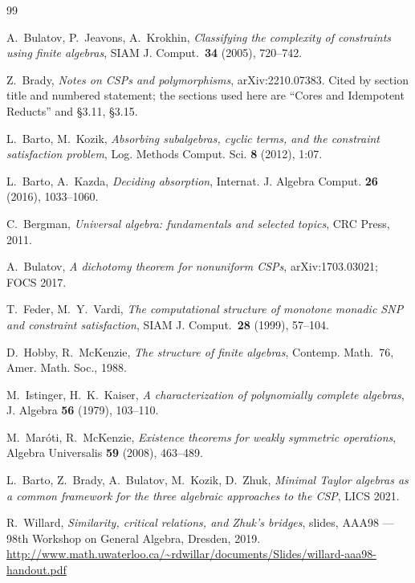 \begin{thebibliography}{99}

 A.~Bulatov, P.~Jeavons, A.~Krokhin,
  \emph{Classifying the complexity of constraints using finite algebras},
  SIAM J. Comput.\ \textbf{34} (2005), 720--742.

 Z.~Brady, \emph{Notes on CSPs and polymorphisms},
  arXiv:2210.07383. Cited by section title and numbered statement; the
  sections used here are ``Cores and Idempotent Reducts'' and \S3.11,
  \S3.15.

 L.~Barto, M.~Kozik, \emph{Absorbing subalgebras, cyclic
  terms, and the constraint satisfaction problem}, Log. Methods Comput. Sci.
  \textbf{8} (2012), 1:07.

 L.~Barto, A.~Kazda, \emph{Deciding absorption},
  Internat. J. Algebra Comput. \textbf{26} (2016), 1033--1060.

 C.~Bergman, \emph{Universal algebra: fundamentals and
  selected topics}, CRC Press, 2011.

 A.~Bulatov, \emph{A dichotomy theorem for nonuniform CSPs},
  arXiv:1703.03021; FOCS 2017.

 T.~Feder, M.~Y.~Vardi, \emph{The computational structure of
  monotone monadic SNP and constraint satisfaction}, SIAM J. Comput.\
  \textbf{28} (1999), 57--104.

 D.~Hobby, R.~McKenzie, \emph{The structure of finite
  algebras}, Contemp. Math.~76, Amer. Math. Soc., 1988.

 M.~Istinger, H.~K.~Kaiser, \emph{A characterization of
  polynomially complete algebras}, J. Algebra \textbf{56} (1979), 103--110.

 M.~Mar\'oti, R.~McKenzie, \emph{Existence theorems for
  weakly symmetric operations}, Algebra Universalis \textbf{59} (2008),
  463--489.

 L.~Barto, Z.~Brady, A.~Bulatov, M.~Kozik, D.~Zhuk,
  \emph{Minimal Taylor algebras as a common framework for the three algebraic
  approaches to the CSP}, LICS 2021.

 R.~Willard, \emph{Similarity, critical relations, and
  Zhuk's bridges}, slides, AAA98 --- 98th Workshop on General Algebra,
  Dresden, 2019.
  \url{http://www.math.uwaterloo.ca/~rdwillar/documents/Slides/willard-aaa98-handout.pdf}


\end{thebibliography}
